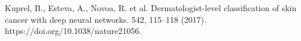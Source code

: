 

\begin{thebibliography}{1}

{Kuprel, B., Esteva, A., Novoa, R. et al.}
\newblock
{Dermatologist-level classification of skin cancer with deep neural networks.}
 542, 115–118 (2017).
\newblock https://doi.org/10.1038/nature21056.

\end{thebibliography}